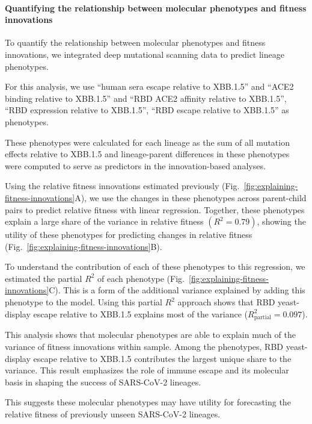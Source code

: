 \paragraph{Quantifying the relationship between molecular phenotypes and fitness innovations}

To quantify the relationship between molecular phenotypes and fitness innovations, we integrated deep mutational scanning data to predict lineage phenotypes.

For this analysis, we use ``human sera escape relative to XBB.1.5'' and ``ACE2 binding relative to XBB.1.5'' \cite{Dadonaite2023} and ``RBD ACE2 affinity relative to XBB.1.5'', ``RBD expression relative to XBB.1.5'', ``RBD escape relative to XBB.1.5'' \cite{Taylor2023} as phenotypes.

These phenotypes were calculated for each lineage as the sum of all mutation effects relative to XBB.1.5 and lineage-parent differences in these phenotypes were computed to serve as predictors in the innovation-based analyses.

Using the relative fitness innovations estimated previously (Fig.~\ref{fig:explaining-fitness-innovations}A), we use the changes in these phenotypes across parent-child pairs to predict relative fitness with linear regression.
Together, these phenotypes explain a large share of the variance in relative fitness $(R^2=0.79)$, showing the utility of these phenotypes for predicting changes in relative fitness (Fig.~\ref{fig:explaining-fitness-innovations}B).

To understand the contribution of each of these phenotypes to this regression, we estimated the partial $R^2$ of each phenotype (Fig.~\ref{fig:explaining-fitness-innovations}C).
This is a form of the additional variance explained by adding this phenotype to the model.
Using this partial $R^2$ approach shows that RBD yeast-display escape relative to XBB.1.5 explains most of the variance ($R^2_{\text{partial}} = 0.097$).

This analysis shows that molecular phenotypes are able to explain much of the variance of fitness innovations within sample.
Among the phenotypes, RBD yeast-display escape relative to XBB.1.5 contributes the largest unique share to the variance. 
This result emphasizes the role of immune escape and its molecular basis in shaping the success of SARS-CoV-2 lineages.

This suggests these molecular phenotypes may have utility for forecasting the relative fitness of previously unseen SARS-CoV-2 lineages.

